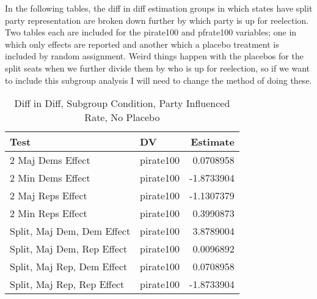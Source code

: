 \documentclass[12pt]{article}
\begin{document}
In the following tables, the diff in diff estimation groups in which states have split party representation are broken down further by which party is up for reelection. Two tables each are included for the pirate100 and pfrate100 variables; one in which only effects are reported and another which a placebo treatment is included by random assignment. Weird things happen with the placebos for the split seats when we further divide them by who is up for reelection, so if we want to include this subgroup analysis I will need to change the method of doing these.

\begin{table}[H]
	\centering
	\caption{Diff in Diff, Subgroup Condition, Party Influenced Rate, No Placebo}
	\begin{tabular}{llr}
		\hline
		Test & DV & Estimate \\ 
		\hline
		2 Maj Dems Effect & pirate100 & 0.0708958 \\  
		2 Min Dems Effect & pirate100 & -1.8733904 \\  
		\hline
		2 Maj Reps Effect & pirate100 & -1.1307379 \\ 
		2 Min Reps Effect & pirate100 & 0.3990873 \\ 
		\hline
		Split, Maj Dem, Dem Effect & pirate100 & 3.8789004 \\ 
		Split, Maj Dem, Rep Effect & pirate100 & 0.0096892 \\  
		\hline
		Split, Maj Rep, Dem Effect & pirate100 & 0.0708958 \\ 
		Split, Maj Rep, Rep Effect & pirate100 & -1.8733904 \\ 
		\hline
	\end{tabular}
\end{table}
\end{document}
